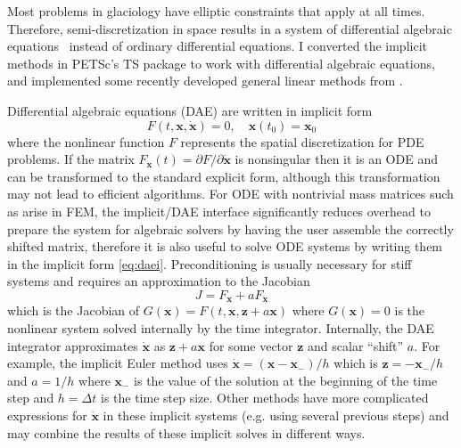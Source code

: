 Most problems in glaciology have elliptic constraints that apply at all times.
Therefore, semi-discretization in space results in a system of differential algebraic equations~\citep{hairer2010solving} instead of ordinary differential equations.
I converted the implicit methods in PETSc's TS package to work with differential algebraic equations, and implemented some recently developed general linear methods from \citet{butcher2006general,butcher2007error}.

Differential algebraic equations (DAE) are written in implicit form
\begin{equation}\label{eq:daei}
  F(t,\bm{x},\dot{\bm{x}}) = 0, \quad \bm{x}(t_0) = \bm{x}_0
\end{equation}
where the nonlinear function $F$ represents the spatial discretization for PDE problems.
If the matrix $F_{\dot{\bm{x}}}(t) = \partial F / \partial \dot{\bm{x}}$ is nonsingular then it is an ODE and can be transformed to the standard explicit form, although this transformation may not lead to efficient algorithms.
For ODE with nontrivial mass matrices such as arise in FEM, the implicit/DAE interface significantly reduces overhead to prepare the system for algebraic solvers by having the user assemble the correctly shifted matrix, therefore it is also useful to solve ODE systems by writing them in the implicit form \eqref{eq:daei}.
Preconditioning is usually necessary for stiff systems and requires an approximation to the Jacobian
\begin{equation*}
  J = F_{\bm{x}} + a F_{\dot{\bm{x}}}
\end{equation*}
which is the Jacobian of $G(\bm{x}) = F(t,\bm{x},\bm{z}+a\bm{x})$ where $G(\bm{x}) = 0$ is the nonlinear system solved internally by the time integrator.
Internally, the DAE integrator approximates $\dot{\bm{x}}$ as $\bm{z} + a\bm{x}$ for some vector $\bm{z}$ and scalar ``shift'' $a$.
For example, the implicit Euler method uses $\dot{\bm{x}} = (\bm{x} - \bm{x}_-)/h$ which is $\bm{z} = -\bm{x}_-/h$ and $a = 1/h$ where $\bm{x}_-$ is the value of the solution at the beginning of the time step and $h = \Delta t$ is the time step size.
Other methods have more complicated expressions for $\dot{\bm{x}}$ in these implicit systems (e.g. using several previous steps) and may combine the results of these implicit solves in different ways.

